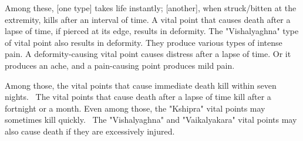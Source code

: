 \begin{translation}
\begin{tt}
\item[22]
Among these, [one type] takes life instantly; [another], when struck/bitten at the extremity, kills after an interval of time. A vital point that causes death after a lapse of time, if pierced at its edge, results in deformity. The "Vishalyaghna" type of vital point also results in deformity. They produce various types of intense pain. A deformity-causing vital point causes distress after a lapse of time. Or it produces an ache, and a pain-causing point produces mild pain.

\item[23]
Among those, the vital points that cause immediate death kill within seven nights. 
The vital points that cause death after a lapse of time kill after a fortnight or a month.
Even among those, the "Kshipra" vital points may sometimes kill quickly. 
The "Vishalyaghna" and "Vaikalyakara" vital points may also cause death if they are excessively injured.

\item[24]


\end{tt}
\end{translation}
